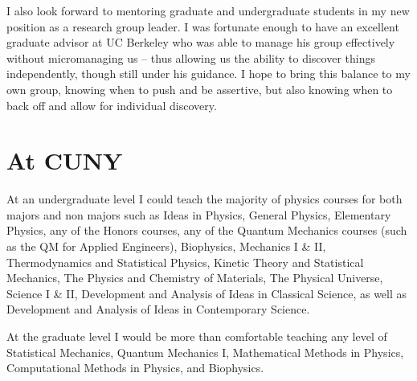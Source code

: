 \documentclass[11pt]{article}
\begin{document}
I also look forward to mentoring graduate and undergraduate students in my new position as a research group leader.  I was fortunate enough to have an excellent graduate advisor at UC Berkeley who was able to manage his group effectively without micromanaging us -- thus allowing us the ability to discover things independently, though still under his guidance.  I hope to bring this balance to my own group, knowing when to push and be assertive, but also knowing when to back off and allow for individual discovery.

\section{At CUNY} %

At an undergraduate level I could teach the majority of physics courses for both majors and non majors such as Ideas in Physics, General Physics, Elementary Physics, any of the Honors courses, any of the Quantum Mechanics courses (such as the QM for Applied Engineers), Biophysics, Mechanics I \& II, Thermodynamics and Statistical Physics, Kinetic Theory and Statistical Mechanics, The Physics and Chemistry of Materials, The Physical Universe, Science I \& II, Development and Analysis of Ideas in Classical Science, as well as Development and Analysis of Ideas in Contemporary Science.

At the graduate level I would be more than comfortable teaching any level of Statistical Mechanics, Quantum Mechanics I, Mathematical Methods in Physics, Computational Methods in Physics, and Biophysics.
\end{document}
